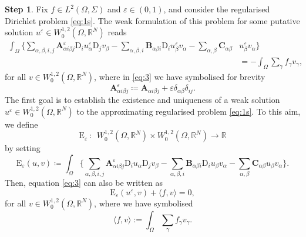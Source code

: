 \documentclass{amsart}
\numberwithin{equation}{section}
\numberwithin{thm}{section}
\theoremstyle{definition}
\newtheorem{proofpart}{Step}
\def\R{\mathbb{R}}
\def\Om{\Omega}
\renewcommand{\:}{\!:\!} %
\newcommand{\e}{\varepsilon}
\newcommand{\larrow}{\longrightarrow}
\newcommand{\by}{\times}
\renewcommand{\^}[1]{^{#1}_{\phantom{l}}}
\begin{document}
\begin{proofpart}
Fix $f \in L^2(\Omega,\Sigma)$ and $\varepsilon \in (0,1)$, and consider the regularised Dirichlet problem \eqref{eq:1s}. The weak formulation of this problem for some putative solution $u^\e \in W^{1,2}_0(\Omega, \R^N)$ reads
\begin{equation} \label{eq:3}
\begin{split}
\int_{\Omega} \biggl\{\sum_{\alpha,\beta, i, j} \mathbf{A}^{\varepsilon}_{\alpha i \beta j}\mathrm{D}_{i}u^{\varepsilon}_{\alpha}\mathrm{D}_{j}v_{\beta} - \sum_{\alpha, \beta, i} \mathbf{B}_{\alpha \beta i}\mathrm{D}_{i}u^{\varepsilon}_{\beta}v_{\alpha} - \sum_{\alpha, \beta} \mathbf{C}_{\alpha \beta} & u^{\varepsilon}_{\beta}v_{\alpha} \biggl\}  
\\
&=  -\int_{\Omega} \sum_{\gamma} f_{\gamma}v_{\gamma},
\end{split}
\end{equation}
for all $v \in W^{1,2}_0(\Omega, \R^N)$, where in \eqref{eq:3} we have symbolised for brevity
\begin{equation*}
\mathbf{A}^{\varepsilon}_{\alpha i \beta j} \coloneqq \mathbf{A}_{\alpha i \beta j} + \varepsilon \delta_{\alpha \beta} \delta_{i j}.
\end{equation*}
The first goal is to establish the existence and uniqueness of a weak solution $u^\e \in W^{1,2}_0(\Omega, \R^N)$ to the approximating regularised problem \eqref{eq:1s}. To this aim, we define
\[
\mathrm{E}_\e \ : \ \ W^{1,2}_0(\Om,\R^N) \by  W^{1,2}_0(\Om,\R^N) \larrow \R
\]
by setting
\[
\mathrm{E}_\e(u, v) \coloneqq \int_{\Omega} \biggl\{\sum_{\alpha,\beta, i, j} \mathbf{A}^{\varepsilon}_{\alpha i \beta j}\mathrm{D}_{i}u_{\alpha}\mathrm{D}_{j}v_{\beta} - \sum_{\alpha, \beta, i} \mathbf{B}_{\alpha \beta i}\mathrm{D}_{i}u_{\beta}v_{\alpha} - \sum_{\alpha, \beta} \mathbf{C}_{\alpha \beta}u_{\beta}v_{\alpha} \biggl\}.
\]
Then, equation \eqref{eq:3} can also be written as
\[
\mathrm{E}_\e(u^\e, v) + \langle f,v \rangle = 0,
\]
for all $v \in W^{1,2}_0(\Omega, \R^N)$, where we have symbolised
\[
\langle f,v \rangle :=  \int_{\Omega} \sum_{\gamma} f_{\gamma}v_{\gamma}.
\]
\end{proofpart}
\end{document}
